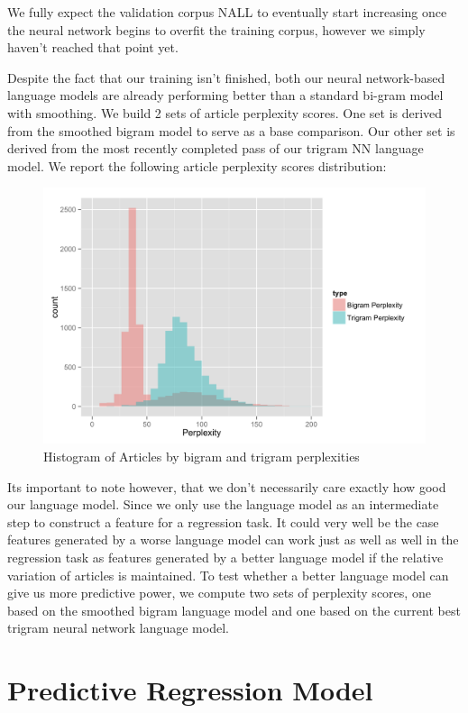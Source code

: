 \documentclass[fleqn,12pt]{SelfArx} %
\begin{document}
We fully expect the validation corpus NALL to eventually start increasing once the neural network begins to overfit the training corpus, however we simply haven't reached that point yet. 
 
Despite the fact that our training isn't finished, both our neural network-based language models are already performing better than a standard bi-gram model with smoothing. We build 2 sets of article perplexity scores. One set is derived from the smoothed bigram model to serve as a base comparison. Our other set is derived from the most recently completed pass of our trigram NN language model. We report the following article perplexity scores distribution:


\begin{figure}[ht]
\includegraphics[width=\linewidth]{perplexity.png}
\caption{Histogram of Articles by bigram and trigram perplexities}
\label{fig:perp_hist}
\end{figure}

Its important to note however, that we don't necessarily care exactly how good our language model. Since we only use the language model as an intermediate step to construct a feature for a regression task. It could very well be the case features generated by a worse language model can work just as well as well in the regression task as features generated by a better language model if the relative variation of articles is maintained. To test whether a better language model can give us more predictive power, we compute two sets of perplexity scores, one based on the smoothed bigram language model and one based on the current best trigram neural network language model. 


\section{Predictive Regression Model}
\end{document}
